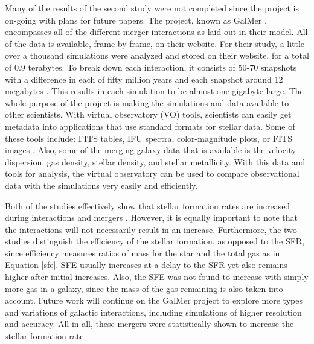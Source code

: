\documentclass[11pt]{article} %
\begin{document}
	Many of the results of the second study were not completed since the project is on-going with plans for future papers. The project, known as GalMer \cite{GalMer}, encompasses all of the different merger interactions as laid out in their model. All of the data is available, frame-by-frame, on their website. For their study, a little over a thousand simulations were analyzed and stored on their website, for a total of 0.9 terabytes. To break down each interaction, it consists of 50-70 snapshots with a difference in each of fifty million years and each snapshot around 12 megabytes \cite{mergers}. This results in each simulation to be almost one gigabyte large. The whole purpose of the project is making the simulations and data available to other scientists. With virtual observatory (VO) tools, scientists can easily get metadata into applications that use standard formats for stellar data. Some of these tools include: FITS tables, IFU spectra, color-magnitude plots, or FITS images \cite{mergers}. Also, some of the merging galaxy data that is available is the velocity dispersion, gas density, stellar density, and stellar metallicity. With this data and tools for analysis, the virtual observatory can be used to compare observational data with the simulations very easily and efficiently.

	Both of the studies effectively show that stellar formation rates are increased during interactions and mergers \cite{mergers,mergerstats}. However, it is equally important to note that the interactions will not necessarily result in an increase. Furthermore, the two studies distinguish the efficiency of the stellar formation, as opposed to the SFR, since efficiency measures ratios of mass for the star and the total gas \cite{mergerstats} as in Equation \ref{sfe}. SFE usually increases at a delay to the SFR yet also remains higher after initial increases. Also, the SFE was not found to increase with simply more gas in a galaxy, since the mass of the gas remaining is also taken into account. Future work will continue on the GalMer project to explore more types and variations of galactic interactions, including simulations of higher resolution and accuracy. All in all, these mergers were statistically shown to increase the stellar formation rate.
\end{document}
